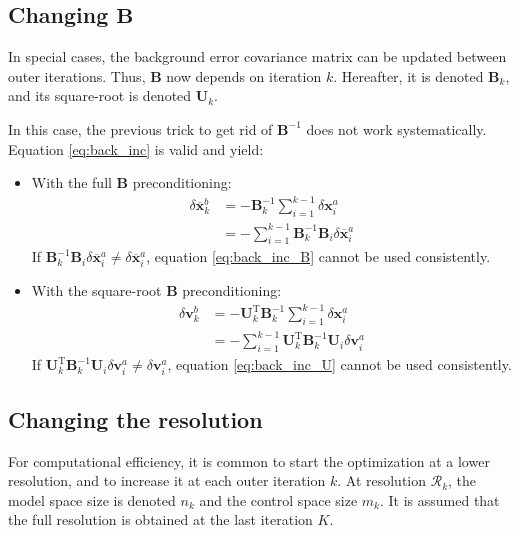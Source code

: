 \documentclass[12pt]{scrartcl}
\begin{document}
\subsection{Changing $\mathbf{B}$}
In special cases, the background error covariance matrix can be updated between outer iterations. Thus, $\mathbf{B}$ now depends on iteration $k$. Hereafter, it is denoted $\mathbf{B}_k$, and its square-root is denoted $\mathbf{U}_k$.

In this case, the previous trick to get rid of $\mathbf{B}^{-1}$ does not work systematically. Equation \eqref{eq:back_inc} is valid and yield:
\begin{itemize}
\item With the full $\mathbf{B}$ preconditioning:
\begin{align}
\label{eq:back_inc_B_diff}
\delta \overline{\mathbf{x}}^b_k & = - \mathbf{B}_k^{-1}\sum_{i=1}^{k-1} \delta \mathbf{x}^a_i \nonumber \\
& = - \sum_{i=1}^{k-1} \mathbf{B}_k^{-1} \mathbf{B}_i \delta \overline{\mathbf{x}}^a_i
\end{align}
If $\mathbf{B}_k^{-1} \mathbf{B}_i \delta \overline{\mathbf{x}}^a_i \ne \delta \overline{\mathbf{x}}^a_i$, equation \eqref{eq:back_inc_B} cannot be used consistently.
\item With the square-root $\mathbf{B}$ preconditioning:
\begin{align}
\label{eq:back_inc_U_diff}
\delta \mathbf{v}^b_k & = - \mathbf{U}_k^\mathrm{T} \mathbf{B}_k^{-1} \sum_{i=1}^{k-1} \delta \mathbf{x}^a_i \nonumber \\
& = - \sum_{i=1}^{k-1} \mathbf{U}_k^\mathrm{T} \mathbf{B}_k^{-1} \mathbf{U}_i \delta \mathbf{v}^a_i
\end{align}
If $\mathbf{U}_k^\mathrm{T} \mathbf{B}_k^{-1} \mathbf{U}_i \delta \mathbf{v}^a_i \ne \delta \mathbf{v}^a_i$, equation \eqref{eq:back_inc_U} cannot be used consistently.
\end{itemize}

\subsection{Changing the resolution}
For computational efficiency, it is common to start the optimization at a lower resolution, and to increase it at each outer iteration $k$. At resolution $\mathcal{R}_k$, the model space size is denoted $n_k$ and the control space size $m_k$. It is assumed that the full resolution is obtained at the last iteration $K$.\\
\end{document}
